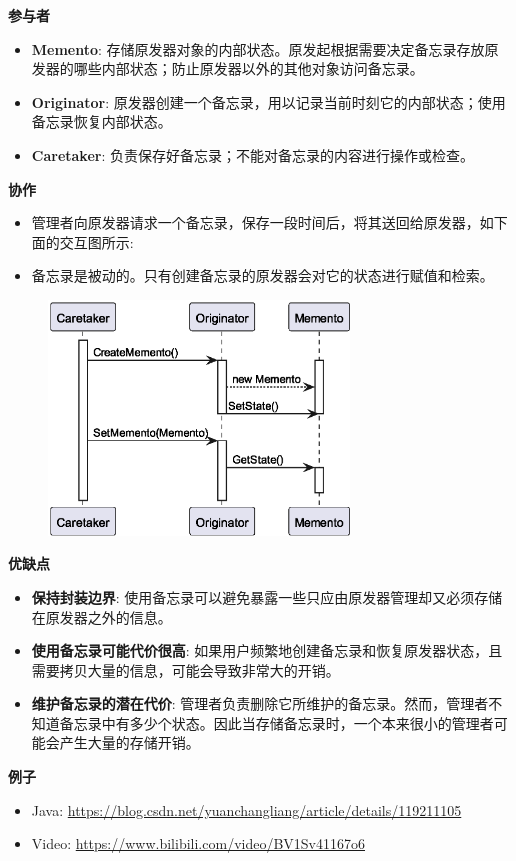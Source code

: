 \noindent\textbf{参与者}

\begin{itemize}
    \item \textbf{Memento}: 存储原发器对象的内部状态。原发起根据需要决定备忘录存放原发器的哪些内部状态；防止原发器以外的其他对象访问备忘录。
    \item \textbf{Originator}: 原发器创建一个备忘录，用以记录当前时刻它的内部状态；使用备忘录恢复内部状态。
    \item \textbf{Caretaker}: 负责保存好备忘录；不能对备忘录的内容进行操作或检查。
\end{itemize}

\noindent\textbf{协作}

\begin{itemize}
    \item 管理者向原发器请求一个备忘录，保存一段时间后，将其送回给原发器，如下面的交互图所示:
    \item 备忘录是被动的。只有创建备忘录的原发器会对它的状态进行赋值和检索。
\end{itemize}

\begin{figure}[H] 
    \centering 
    \includegraphics[width=8cm]{figures/Memento.eps} 
\end{figure}

\noindent\textbf{优缺点}

\begin{itemize}
    \item \textbf{保持封装边界}: 使用备忘录可以避免暴露一些只应由原发器管理却又必须存储在原发器之外的信息。
    \item \textbf{使用备忘录可能代价很高}: 如果用户频繁地创建备忘录和恢复原发器状态，且需要拷贝大量的信息，可能会导致非常大的开销。
    \item \textbf{维护备忘录的潜在代价}: 管理者负责删除它所维护的备忘录。然而，管理者不知道备忘录中有多少个状态。因此当存储备忘录时，一个本来很小的管理者可能会产生大量的存储开销。
\end{itemize}

\noindent\textbf{例子}

\begin{itemize}
    \item Java: \url{https://blog.csdn.net/yuanchangliang/article/details/119211105}
    \item Video: \url{https://www.bilibili.com/video/BV1Sv41167o6}
\end{itemize}



\newpage